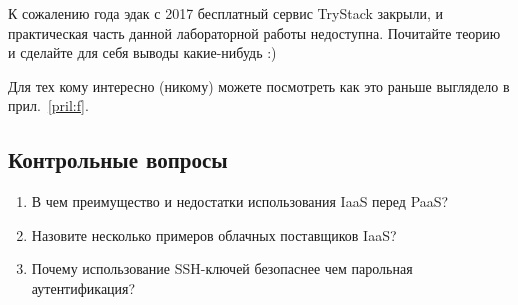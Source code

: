 К сожалению года эдак с 2017 бесплатный сервис TryStack закрыли, и практическая часть данной лабораторной работы недоступна.
Почитайте теорию и сделайте для себя выводы какие-нибудь :)

Для тех кому интересно (никому) можете посмотреть как это раньше выглядело в прил.~\ref{pril:f}.

\subsection{Контрольные вопросы}
\begin{enumerate}
    \item В чем преимущество и недостатки использования IaaS перед PaaS?
    \item Назовите несколько примеров облачных поставщиков IaaS?
    \item Почему использование SSH-ключей безопаснее чем парольная аутентификация?
\end{enumerate}

\clearpage
